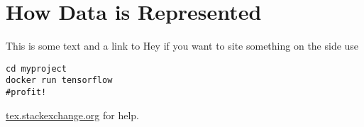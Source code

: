 \setchapterpreamble[u]{\margintoc}
\chapter{How Data is Represented}


This is some text and a link to 
Hey if you want to site something on the side use


\begin{lstlisting}[style=kaolstplain,linewidth=1.5\textwidth]
cd myproject
docker run tensorflow
#profit!
\end{lstlisting}

\url{tex.stackexchange.org} for help.
